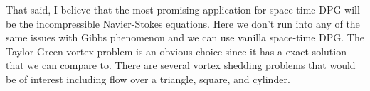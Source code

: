 \documentclass[letterpaper]{article}
\begin{document}
That said, I believe that the most promising application for space-time DPG will be the incompressible Navier-Stokes equations.
Here we don't run into any of the same issues with Gibbs phenomenon and we can use vanilla space-time DPG.
The Taylor-Green vortex problem is an obvious choice since it has a exact solution that we can compare to.
There are several vortex shedding problems that would be of interest including flow over a triangle, square, and cylinder.



\end{document}
